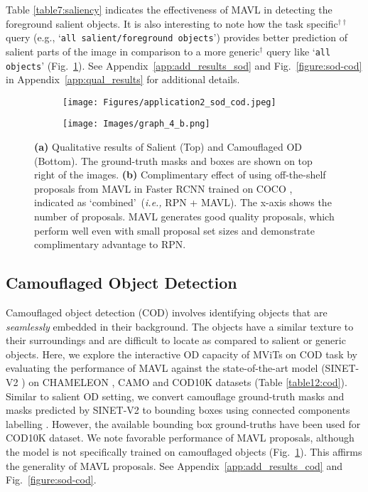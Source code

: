 \documentclass[runningheads]{llncs}
\def\ie{\emph{i.e.,}\xspace} \def\Ie{\emph{I.e.}\xspace}
\newcommand{\txt}[1]{{\texttt{#1}}}
\begin{document}
Table \ref{table7:saliency} indicates the effectiveness of MAVL in detecting the foreground salient objects. It is also interesting to note how the task specific$^{\dagger \dagger}$ query (e.g., ‘\txt{all salient/foreground objects}') provides better prediction of salient parts of the image in comparison to a more generic$^{\dagger}$ query like ‘\txt{all objects}' (Fig.~\ref{fig:appl_2}). See Appendix~\ref{app:add_results_sod} and Fig.~\ref{figure:sod-cod} in Appendix~\ref{app:qual_results} for additional details.
\begin{figure}[!t]
  \centering
  \begin{subfigure}{.5\textwidth}
    \centering
    \texttt{[image: Figures/application2\_sod\_cod.jpeg]}
    \caption{}
    \label{fig:appl_2}
  \end{subfigure}\hfill
  \begin{subfigure}{.48\textwidth}
    \centering
    \texttt{[image: Images/graph\_4\_b.png]}
    \caption{}
    \label{fig:graph_4_rpn}
  \end{subfigure}
\caption{\small
\textbf{\color{blue}(a)} Qualitative results of Salient (Top) and Camouflaged OD (Bottom). The ground-truth masks and boxes are shown on top right of the images. 
\textbf{\color{blue}(b)} 
Complimentary effect of using off-the-shelf proposals from MAVL in Faster RCNN \cite{ren2015faster} trained on COCO \cite{coco}, indicated as \lq combined\rq~(\ie RPN + MAVL). The x-axis shows the number of proposals. MAVL generates good quality proposals, which perform well even with  small proposal set sizes and demonstrate complimentary advantage to RPN.}
\label{fig:6-7_comb}
\end{figure}
\subsection{Camouflaged Object Detection}
Camouflaged object detection (COD) involves identifying objects that are \emph{seamlessly} embedded in their background. The objects have a similar texture to their surroundings and are difficult to locate as compared to salient or generic objects. Here, we explore the interactive OD capacity of MViTs on COD task by evaluating the performance of MAVL against the state-of-the-art model (SINET-V2 \cite{SINET-V2}) on CHAMELEON \cite{CHAMELEON}, CAMO \cite{CAMO} and COD10K \cite{fan2020camouflaged} datasets (Table \ref{table12:cod}). Similar to salient OD setting, we convert camouflage ground-truth masks and masks predicted by SINET-V2 to bounding boxes using connected components labelling \cite{wu2005optimizing}. However, the available bounding box ground-truths have been used for COD10K dataset. 
We note favorable performance of MAVL proposals, although the model is not specifically trained on camouflaged objects (Fig.~\ref{fig:appl_2}). This affirms the generality of MAVL proposals. See Appendix~\ref{app:add_results_cod} and Fig.~\ref{figure:sod-cod}.
\end{document}
